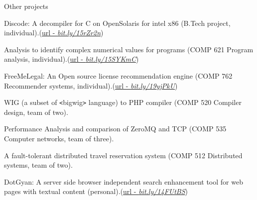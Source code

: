 \documentclass{resume} %
\begin{document}
\begin{rSection}{Other projects}
\smallskip
\begin{lSubsection}
	\item Discode: A decompiler for C on OpenSolaris for intel x86 (B.Tech
project, individual).(\href{http://vineetkumar.net/discode/}{url - \em{bit.ly/15rZr2n}})
    \item Analysis to identify complex numerical values for \matlab
programs (COMP 621 Program analysis, individual).(\href{https://github.com/Sable/mclab/tree/master/languages/Natlab/src/natlab/tame/valueanalysis/components/isComplex}{url - \em{bit.ly/15SYKmC}}) 
    \item FreeMeLegal: An Open source license recommendation engine (COMP 762
Recommender systems, individual).(\href{http://vineetkumar.net/freeMeLegal/free-me-legal_final_report.pdf}{url - \em{bit.ly/19yjPkU}})
    \item WIG (a subset of \verb+<+bigwig\verb+>+ language) to PHP compiler
(COMP 520 Compiler design, team of two).
    \item Performance Analysis and comparison of ZeroMQ and TCP (COMP 535
Computer networks, team of three).
    \item A fault-tolerant distributed travel reservation system (COMP 512
Distributed systems, team of two). 	
    \item DotGyan: A server side browser independent search enhancement tool for web pages with textual content (personal).(\href{http://vineetkumar.net/dotgyan/}{url - \em{bit.ly/14FUtBS}})

\end{lSubsection}
\end{rSection}

\end{document}
